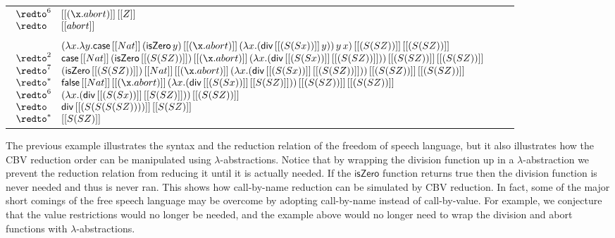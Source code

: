 \begin{example}
\begin{center}
\begin{tabular}{lll}
\begin{math}
\begin{array}{lll}
        \redto^6 & [[(\x.abort)]]\,[[Z]]\\
        \redto   & [[abort]]\\
      \end{array}
    \end{math}\\
    \\
    \begin{math}
      \begin{array}{lll}
                 & (\lambda x.\lambda y.\mathsf{case}\,[[Nat]]\,(\mathsf{isZero}\,y)\,[[(\x.abort)]]\,(\lambda x.(\mathsf{div}\,[[(S (S x))]]\,y))\,y\,x)\,[[(S (S Z))]]\,[[(S (S Z))]] \\
        \redto^2 & \mathsf{case}\,[[Nat]]\,(\mathsf{isZero}\,[[(S (S Z))]])\,[[(\x.abort)]]\,(\lambda x.(\mathsf{div}\,[[(S (S x))]]\,[[(S (S Z))]]))\,[[(S (S Z))]]\,[[(S (S Z))]] \\
        \redto^7 & (\mathsf{isZero}\,[[(S (S Z))]])\,[[Nat]]\,[[(\x.abort)]]\,(\lambda x.(\mathsf{div}\,[[(S (S x))]]\,[[(S (S Z))]]))\,[[(S (S Z))]]\,[[(S (S Z))]] \\
        \redto^* & \mathsf{false}\,[[Nat]]\,[[(\x.abort)]]\,(\lambda x.(\mathsf{div}\,[[(S (S x))]]\,[[S (S Z)]]))\,[[(S (S Z))]]\,[[(S (S Z))]] \\
        \redto^6 & (\lambda x.(\mathsf{div}\,[[(S (S x))]]\,[[S (S Z)]]))\,[[(S (S Z))]]\\
        \redto   & \mathsf{div}\,[[(S (S (S (S Z))))]]\,[[S (S Z)]]\\
        \redto^* & [[S (S Z)]]\\
      \end{array}
    \end{math}
    \end{tabular}
  \end{center}
\end{example}

The previous example illustrates the syntax and the reduction relation
of the freedom of speech language, but it also illustrates how the CBV
reduction order can be manipulated using $\lambda$-abstractions.
Notice that by wrapping the division function up in a
$\lambda$-abstraction we prevent the reduction relation from reducing
it until it is actually needed.  If the $\mathsf{isZero}$ function
returns true then the division function is never needed and thus is
never ran.  This shows how call-by-name reduction can be simulated by
CBV reduction.  In fact, some of the major short comings of the free
speech language may be overcome by adopting call-by-name instead of
call-by-value.  For example, we conjecture that the value restrictions
would no longer be needed, and the example above would no longer need
to wrap the division and abort functions with $\lambda$-abstractions.

